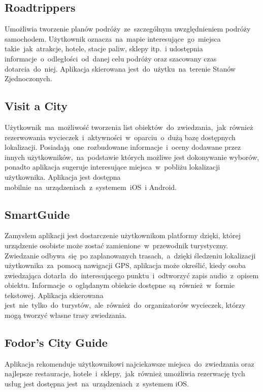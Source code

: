 \subsection{Roadtrippers}
\label{subsec:roadtrippers}
Umożliwia tworzenie planów podróży~ze~szczególnym uwzględnieniem podróży samochodem.
Użytkownik oznacza~na~mapie interesujące~go~miejsca takie~jak~atrakcje, hotele, stacje paliw, sklepy itp.~i udostępnia informacje~o~odległości~od~danej celu podróży oraz szacowany czas dotarcia~do~niej.
Aplikacja skierowana jest~do~użytku~na~terenie Stanów Zjednoczonych.

\subsection{Visit a City}
\label{subsec:visit-a-city}
Użytkownik~ma~możliwość tworzenia list obiektów~do~zwiedzania,~jak~również rezerwowania wycieczek~i~aktywności~w~oparciu~o~dużą bazę dostępnych lokalizacji.
Posiadają~one~rozbudowane informacje~i~oceny dodawane przez innych użytkowników,~na~podstawie których możliwe jest dokonywanie wyborów, ponadto aplikacja sugeruje interesujące miejsca~w~pobliżu lokalizacji użytkownika.
Aplikacja jest dostępna mobilnie~na~urządzeniach~z~systemem~iOS~i Android.

\subsection{SmartGuide}
\label{subsec:smartguide}
Zamysłem aplikacji jest dostarczenie użytkownikom platformy dzięki, której urządzenie osobiste może zostać zamienione~w~przewodnik turystyczny.
Zwiedzanie odbywa~się~po zaplanowanych trasach,~a~dzięki śledzeniu lokalizacji użytkownika~za~pomocą nawigacji GPS, aplikacja może określić, kiedy osoba zwiedzająca dotarła~do~interesującego punktu~i~odtworzyć zapis audio~z~opisem obiektu.
Informacje~o~oglądanym obiekcie dostępne~są~również~w~formie tekstowej.
Aplikacja skierowana jest~nie~tylko~do~turystów,~ale~również~do~organizatorów wycieczek, którzy mogą tworzyć własne trasy zwiedzania.

\subsection{Fodor's City Guide}
\label{subsec:fodor's-city-guide}
Aplikacja rekomenduje użytkownikowi najciekawsze miejsca~do~zwiedzania oraz najlepsze restauracje, hotele~i~sklepy,~jak~również umożliwia rezerwację tych usług jest dostępna jest~na~urządzeniach~z~systemem iOS\@.

